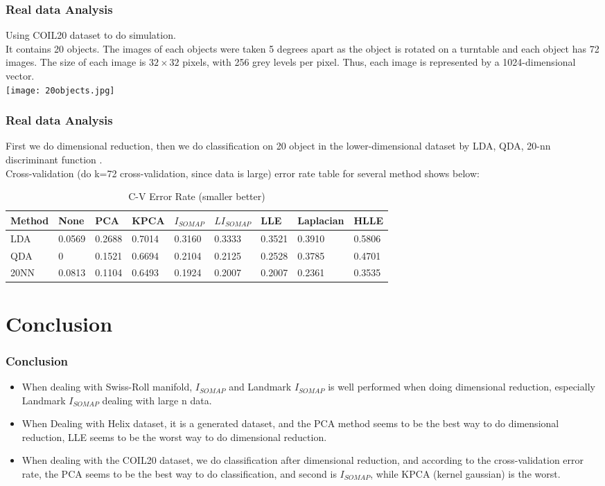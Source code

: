 \documentclass{beamer}
\begin{document}
\begin{frame}
\frametitle{Real data Analysis}
Using COIL20 dataset to do simulation.\\
It contains 20 objects. The images of each objects were taken 5 degrees apart as the object is rotated on a turntable and each object has 72 images. The size of each image is $32\times 32$ pixels, with 256 grey levels per pixel. Thus, each image is represented by a 1024-dimensional vector.\\
\texttt{[image: 20objects.jpg]}
\end{frame}

\begin{frame}
\frametitle{Real data Analysis}
First we do dimensional reduction, then we do classification on 20 object in the lower-dimensional dataset by LDA, QDA, 20-nn discriminant function .\\
Cross-validation (do k=72 cross-validation, since data is large) error rate table for several method shows below:\\
\tabcolsep=0.03cm
\begin{table}[]
\centering
\caption{C-V Error Rate (smaller better)}
\label{my-label}
\begin{tabular}{|l|l|l|l|l|l|l|l|l|}
\hline
Method &None    & PCA    & KPCA   & $I_{SOMAP}$ & $LI_{SOMAP}$ & LLE    & Laplacian & HLLE   \\ \hline
LDA &0.0569& 0.2688 & 0.7014 & 0.3160 & 0.3333  & 0.3521 & 0.3910    & 0.5806 \\ \hline
QDA &0& 0.1521 & 0.6694 & 0.2104 & 0.2125  & 0.2528 & 0.3785    & 0.4701 \\ \hline
20NN &0.0813& 0.1104 & 0.6493 & 0.1924 & 0.2007  & 0.2007 & 0.2361    & 0.3535 \\ \hline
\end{tabular}
\end{table}
\end{frame}

\section{Conclusion}

\begin{frame}
\frametitle{Conclusion}
\begin{itemize}
\item {When dealing with Swiss-Roll manifold, $I_{SOMAP}$ and Landmark $I_{SOMAP}$ is well performed when doing dimensional reduction, especially Landmark $I_{SOMAP}$ dealing with large n data.}
\item {When Dealing with Helix dataset, it is a generated dataset, and the PCA method seems to be the best way to do dimensional reduction, LLE seems to be the worst way to do dimensional reduction.}
\item {When dealing with the COIL20 dataset, we do classification after dimensional reduction, and according to the cross-validation error rate, the PCA seems to be the best way to do classification, and second is $I_{SOMAP}$, while KPCA (kernel gaussian) is the worst.}
\end{itemize}
\end{frame}
\end{document}
